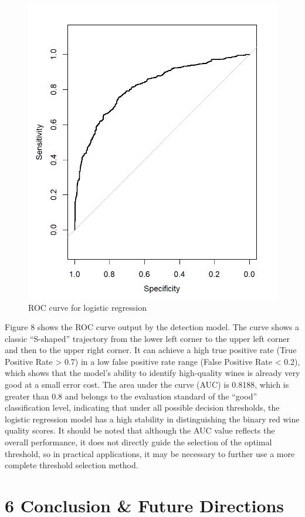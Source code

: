 \documentclass[
  doc,floatsintext]{apa6}
\begin{document}
\begin{figure}[H]

{\centering \includegraphics[width=0.6\linewidth]{../plots/ROC} 

}

\caption{ROC curve for logistic regression}\label{fig:ROC}
\end{figure}

Figure 8 shows the ROC curve output by the detection model. The curve shows a classic ``S-shaped'' trajectory from the lower left corner to the upper left corner and then to the upper right corner. It can achieve a high true positive rate (True Positive Rate \textgreater{} 0.7) in a low false positive rate range (False Positive Rate \textless{} 0.2), which shows that the model's ability to identify high-quality wines is already very good at a small error cost. The area under the curve (AUC) is 0.8188, which is greater than 0.8 and belongs to the evaluation standard of the ``good'' classification level, indicating that under all possible decision thresholds, the logistic regression model has a high stability in distinguishing the binary red wine quality scores. It should be noted that although the AUC value reflects the overall performance, it does not directly guide the selection of the optimal threshold, so in practical applications, it may be necessary to further use a more complete threshold selection method.

\section{6 Conclusion \& Future Directions}\label{conclusion-future-directions}
\end{document}
